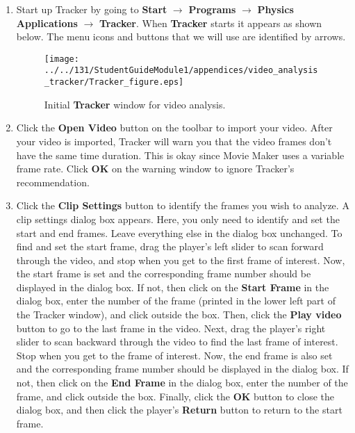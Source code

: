 \begin{enumerate}

\item Start up Tracker by going to {\bf Start} $\rightarrow$ {\bf Programs} $\rightarrow$ {\bf Physics Applications} $\rightarrow$ {\bf Tracker}. 
When {\bf Tracker} starts it appears as shown below. The menu icons and buttons that we will use are identified by arrows.
\begin{figure}[hbt]
\begin{center}
\texttt{[image: ../../131/StudentGuideModule1/appendices/video\_analysis\_tracker/Tracker\_figure.eps]}
\caption{Initial {\bf Tracker} window for video analysis.}
\end{center}
\end{figure}

\item Click the {\bf Open Video} button on the toolbar to import your video. 
After your video is imported, Tracker will warn you that the video frames 
don't have the same time duration. 
This is okay since Movie Maker uses a variable frame rate. 
Click {\bf OK} on the warning window to ignore Tracker's recommendation.

\item Click the {\bf Clip Settings} button to identify the frames you wish to analyze. 
A clip settings dialog box appears. 
Here, you only need to identify and set the start and end frames. 
Leave everything else in the dialog box unchanged. 
To find and set the start frame, drag the player's left slider to scan forward through the video, and 
stop when you get to the first frame of interest. 
Now, the start frame is set and the corresponding frame number should be displayed in the dialog box. 
If not, then click on the {\bf Start Frame} in the dialog box, enter the number of the frame 
(printed in the lower left part of the Tracker window), and click outside the box.
Then, click the {\bf Play video} button to go to the last frame in the video. 
Next, drag the player's right slider to scan backward through the video to find the last frame of interest. 
Stop when you get to the frame of interest. Now, the end frame is also set and the corresponding frame number should be displayed in the dialog box. 
If not, then click on the {\bf End Frame} in the dialog box, enter the number of the frame, and click outside the box.
Finally, click the {\bf OK} button to close the dialog box, and then click the player's {\bf Return} button to return to the start frame.


\end{enumerate}
